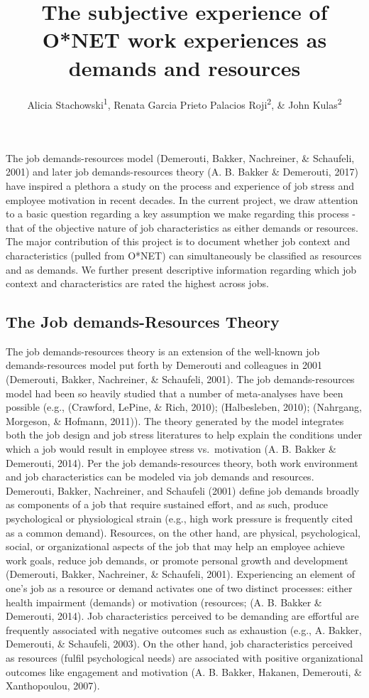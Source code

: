 \documentclass[
  english,
  man]{apa6}
\title{The subjective experience of O*NET work experiences as demands and resources}
\author{Alicia Stachowski\textsuperscript{1}, Renata Garcia Prieto Palacios Roji\textsuperscript{2}, \& John Kulas\textsuperscript{2}}
\date{}
\affiliation{\vspace{0.5cm}\textsuperscript{1} University of Wisconsin - Stout\\\textsuperscript{2} Montclair State University}
\begin{document}
\maketitle

The job demands-resources model (Demerouti, Bakker, Nachreiner, \& Schaufeli, 2001) and later job demands-resources theory (A. B. Bakker \& Demerouti, 2017) have inspired a plethora a study on the process and experience of job stress and employee motivation in recent decades. In the current project, we draw attention to a basic question regarding a key assumption we make regarding this process - that of the objective nature of job characteristics as either demands or resources. The major contribution of this project is to document whether job context and characteristics (pulled from O*NET) can simultaneously be classified as resources and as demands. We further present descriptive information regarding which job context and characteristics are rated the highest across jobs.

\hypertarget{the-job-demands-resources-theory}{%
\subsection{The Job demands-Resources Theory}\label{the-job-demands-resources-theory}}

The job demands-resources theory is an extension of the well-known job demands-resources model put forth by Demerouti and colleagues in 2001 (Demerouti, Bakker, Nachreiner, \& Schaufeli, 2001). The job demands-resources model had been so heavily studied that a number of meta-analyses have been possible (e.g., (Crawford, LePine, \& Rich, 2010);
(Halbesleben, 2010); (Nahrgang, Morgeson, \& Hofmann, 2011)). The theory generated by the model integrates both the job design and job stress literatures to help explain the conditions under which a job would result in employee stress vs.~motivation (A. B. Bakker \& Demerouti, 2014). Per the job demands-resources theory, both work environment and job characteristics can be modeled via job demands and resources. Demerouti, Bakker, Nachreiner, and Schaufeli (2001) define job demands broadly as components of a job that require sustained effort, and as such, produce psychological or physiological strain (e.g., high work pressure is frequently cited as a common demand). Resources, on the other hand, are physical, psychological, social, or organizational aspects of the job that may help an employee achieve work goals, reduce job demands, or promote personal growth and development (Demerouti, Bakker, Nachreiner, \& Schaufeli, 2001).
Experiencing an element of one's job as a resource or demand activates one of two distinct processes: either health impairment (demands) or motivation (resources; (A. B. Bakker \& Demerouti, 2014). Job characteristics perceived to be demanding are effortful are frequently associated with negative outcomes such as exhaustion (e.g., A. Bakker, Demerouti, \& Schaufeli, 2003). On the other hand, job characteristics perceived as resources (fulfil psychological needs) are associated with positive organizational outcomes like engagement and motivation (A. B. Bakker, Hakanen, Demerouti, \& Xanthopoulou, 2007).
\end{document}
